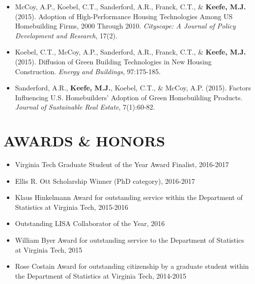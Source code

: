 \documentclass[10pt]{article}
\begin{document}
\begin{itemize}
\item[] McCoy, A.P., Koebel, C.T., Sanderford, A.R., Franck, C.T., \& \textbf{Keefe, M.J.} (2015). Adoption of High-Performance Housing Technologies Among US Homebuilding Firms, 2000 Through 2010. \textit{Cityscape: A Journal of Policy Development and Research}, 17(2).

\item[] Koebel, C.T., McCoy, A.P., Sanderford, A.R., Franck, C.T., \& \textbf{Keefe, M.J.} (2015). Diffusion of Green Building Technologies in New Housing Construction. \textit{Energy and Buildings}, 97:175-185.

\item[] Sanderford, A.R., \textbf{Keefe, M.J.}, Koebel, C.T., \& McCoy, A.P. (2015). Factors Influencing U.S. Homebuilders' Adoption of Green Homebuilding Products. \textit{Journal of Sustainable Real Estate}, 7(1):60-82.

\end{itemize}

\section*{AWARDS \& HONORS}
\begin{itemize}
\item Virginia Tech Graduate Student of the Year Award Finalist, 2016-2017 
\item Ellis R. Ott Scholarship Winner (PhD category), 2016-2017 
\item Klaus Hinkelmann Award for outstanding service within the Department of Statistics at Virginia Tech, 2015-2016 
\item Outstanding LISA Collaborator of the Year, 2016
\item William Byer Award for outstanding service to the Department of Statistics at Virginia Tech, 2015
\item Rose Costain Award for outstanding citizenship by a graduate student within the Department of Statistics at Virginia Tech, 2014-2015 

\end{itemize}
\end{document}
